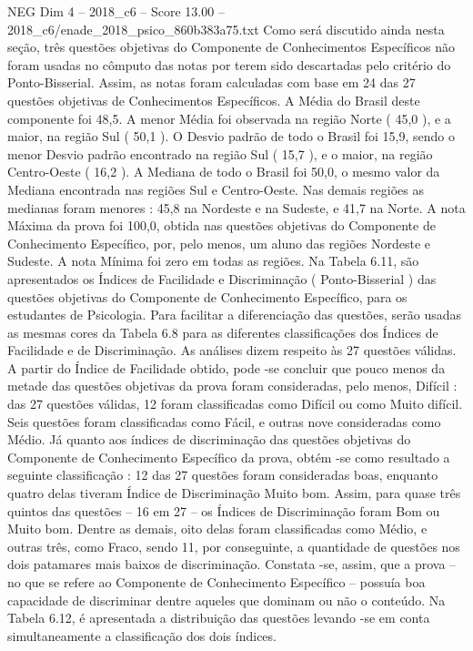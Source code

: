 \begin{textsample}{NEG Dim 4 – 2018\_c6 – Score 13.00 – 2018\_c6/enade\_2018\_psico\_860b383a75.txt}
Como será discutido ainda nesta seção, três questões objetivas do Componente de Conhecimentos Específicos não foram usadas no cômputo das notas por terem sido descartadas pelo critério do Ponto-Bisserial.
Assim, as notas foram calculadas com base em 24 das 27 questões objetivas de Conhecimentos Específicos.
A Média do Brasil deste componente foi 48,5.
A menor Média foi observada na região Norte ( 45,0 ), e a maior, na região Sul ( 50,1 ).
O Desvio padrão de todo o Brasil foi 15,9, sendo o menor Desvio padrão encontrado na região Sul ( 15,7 ), e o maior, na região Centro-Oeste ( 16,2 ).
A Mediana de todo o Brasil foi 50,0, o mesmo valor da Mediana encontrada nas regiões Sul e Centro-Oeste.
Nas demais regiões as medianas foram menores : 45,8 na Nordeste e na Sudeste, e 41,7 na Norte.
A nota Máxima da prova foi 100,0, obtida nas questões objetivas do Componente de Conhecimento Específico, por, pelo menos, um aluno das regiões Nordeste e Sudeste.
A nota Mínima foi zero em todas as regiões.
Na Tabela 6.11, são apresentados os Índices de Facilidade e Discriminação ( Ponto-Bisserial ) das questões objetivas do Componente de Conhecimento Específico, para os estudantes de Psicologia.
Para facilitar a diferenciação das questões, serão usadas as mesmas cores da Tabela 6.8 para as diferentes classificações dos Índices de Facilidade e de Discriminação.
As análises dizem respeito às 27 questões válidas.
A partir do Índice de Facilidade obtido, pode -se concluir que pouco menos da metade das questões objetivas da prova foram consideradas, pelo menos, Difícil : das 27 questões válidas, 12 foram classificadas como Difícil ou como Muito difícil.
Seis questões foram classificadas como Fácil, e outras nove consideradas como Médio.
Já quanto aos índices de discriminação das questões objetivas do Componente de Conhecimento Específico da prova, obtém -se como resultado a seguinte classificação : 12 das 27 questões foram consideradas boas, enquanto quatro delas tiveram Índice de Discriminação Muito bom.
Assim, para quase três quintos das questões – 16 em 27 – os Índices de Discriminação foram Bom ou Muito bom.
Dentre as demais, oito delas foram classificadas como Médio, e outras três, como Fraco, sendo 11, por conseguinte, a quantidade de questões nos dois patamares mais baixos de discriminação.
Constata -se, assim, que a prova – no que se refere ao Componente de Conhecimento Específico – possuía boa capacidade de discriminar dentre aqueles que dominam ou não o conteúdo.
Na Tabela 6.12, é apresentada a distribuição das questões levando -se em conta simultaneamente a classificação dos dois índices.

\end{textsample}
